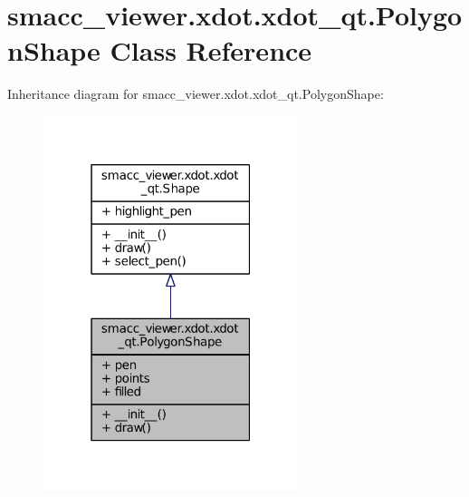 \hypertarget{classsmacc__viewer_1_1xdot_1_1xdot__qt_1_1PolygonShape}{}\section{smacc\+\_\+viewer.\+xdot.\+xdot\+\_\+qt.\+Polygon\+Shape Class Reference}
\label{classsmacc__viewer_1_1xdot_1_1xdot__qt_1_1PolygonShape}


Inheritance diagram for smacc\+\_\+viewer.\+xdot.\+xdot\+\_\+qt.\+Polygon\+Shape\+:
\nopagebreak
\begin{figure}[H]
\begin{center}
\leavevmode
\includegraphics[width=211pt]{classsmacc__viewer_1_1xdot_1_1xdot__qt_1_1PolygonShape__inherit__graph}
\end{center}
\end{figure}



